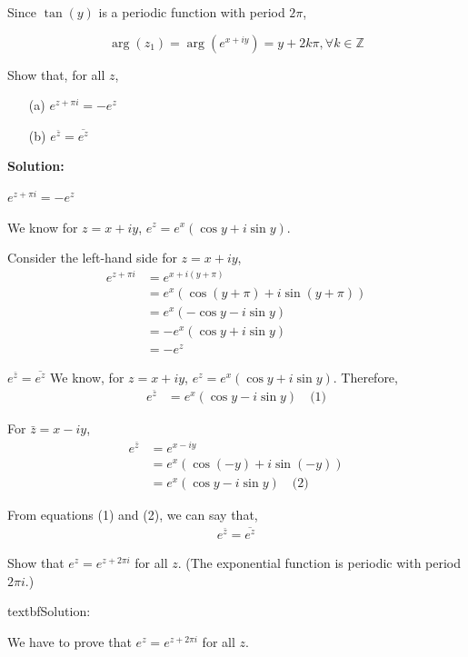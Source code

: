 \documentclass[
	12pt, %
	fleqn, %
	a4paper, %
]{LegrandOrangeBook}
\begin{document}
Since \( \tan(y) \) is a periodic function with period \( 2\pi \),

\[
\arg(z_1) = \arg(e^{x+iy}) = y + 2k\pi, \forall k \in \mathbb{Z}
\]
\begin{exercise}
    Show that, for all \( z \),
\begin{enumerate}
    \item[(a)] \( e^{z+\pi i} = -e^z \)
    \item[(b)] \( e^{\bar{z}} = \overline{e^z} \)
\end{enumerate}
\end{exercise}\textbf{Solution:}

\( e^{z+\pi i} = -e^z \)

We know for \( z = x + iy \), \( e^z = e^{x}(\cos y + i \sin y) \).

Consider the left-hand side for \( z = x + iy \),
\begin{align*}
e^{z+\pi i} &= e^{x+i(y+\pi)} \\
&= e^{x}(\cos(y + \pi) + i \sin(y + \pi)) \\
&= e^{x}(-\cos y - i \sin y) \\
&= -e^{x}(\cos y + i \sin y) \\
&= -e^z
\end{align*}


\( e^{\bar{z}} = \overline{e^z} \)
We know, for \( z = x + iy \), \( e^z = e^{x}(\cos y + i \sin y) \). Therefore,
\begin{align*}
e^{\bar{z}} &= e^{x}(\cos y - i \sin y) \quad \text{(1)}
\end{align*}

For \( \bar{z} = x - iy \),
\begin{align*}
e^{\bar{z}} &= e^{x-i y} \\
&= e^{x}(\cos(-y) + i \sin(-y)) \\
&= e^{x}(\cos y - i \sin y) \quad \text{(2)}
\end{align*}

From equations (1) and (2), we can say that,
\begin{align*}
e^{\bar{z}} = \overline{e^z}
\end{align*}

\begin{exercise}
    Show that \( e^z = e^{z+2\pi i} \) for all \( z \). (The exponential function is periodic with period \( 2\pi i \).)
\end{exercise} textbf{Solution:}

We have to prove that \( e^z = e^{z+2\pi i} \) for all \( z \).
\end{document}
